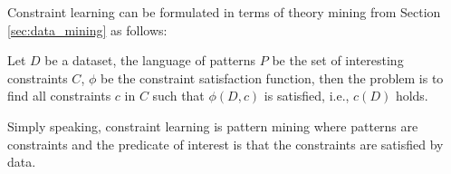Constraint learning can be formulated in terms of theory mining from
 Section \ref{sec:data_mining} as follows:\\
\begin{definition*}
\begin{mdframed}
 Let $D$ be a dataset, the language of patterns $P$ be the set of
 interesting constraints $C$, 
 $\phi$ be the constraint satisfaction function, 
 then the problem is to find all constraints $c$ in $C$
 such that $\phi(D,c)$ is satisfied, i.e., $c(D)$ holds.
\end{mdframed}
\end{definition*}
Simply speaking, constraint learning is pattern mining where patterns
are constraints and the predicate of interest is that the constraints
are satisfied by data.





